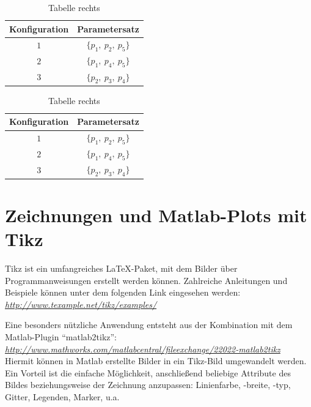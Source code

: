\begin{table}[htbp]
\caption{Hauptbeschriftung}
\centering
	\begin{subtable}[t]{.5\textwidth}
	\centering
			\caption{Tabelle links}
			\begin{tabular}{cc}
				\toprule
				Konfiguration & Parametersatz \\
				\midrule
				$1$ & $\{p_{1}, \: p_{2}, \: p_{5}\}$ \\
				$2$ & $\{p_{1}, \: p_{4}, \: p_{5}\}$ \\
				$3$ & $\{p_{2}, \: p_{3}, \: p_{4}\}$ \\
				\bottomrule
			\end{tabular}
			\label{tab:parameter_tabelle1}
	\end{subtable}%
	\begin{subtable}[t]{.5\textwidth}
			\centering
			\caption{Tabelle rechts}
			\begin{tabular}{cc}
				\toprule
				Konfiguration & Parametersatz \\
				\midrule
				$1$ & $\{p_{1}, \: p_{2}, \: p_{5}\}$ \\
				$2$ & $\{p_{1}, \: p_{4}, \: p_{5}\}$ \\
				$3$ & $\{p_{2}, \: p_{3}, \: p_{4}\}$ \\
				\bottomrule
			\end{tabular}
			\label{tab:parameter_tabelle2}
	\end{subtable}
	\label{tab:parameter_tabellen}
\end{table}




%
%
%
\clearpage
\section{Zeichnungen und Matlab-Plots mit Tikz}
\label{sec:tikz}

Tikz ist ein umfangreiches \LaTeX-Paket, mit dem Bilder über Programmanweisungen erstellt werden können.
Zahlreiche Anleitungen und Beispiele können unter dem folgenden Link eingesehen werden:\\ 
\href{http://www.texample.net/tikz/examples/}{\emph{http://www.texample.net/tikz/examples/}}

Eine besonders nützliche Anwendung entsteht aus der Kombination mit dem Matlab-Plugin "`matlab2tikz"':\\
\href{http://www.mathworks.com/matlabcentral/fileexchange/22022-matlab2tikz}{\emph{http://www.mathworks.com/matlabcentral/fileexchange/22022-matlab2tikz}}\\
Hiermit können in Matlab erstellte Bilder in ein Tikz-Bild umgewandelt werden.
Ein Vorteil ist die einfache Möglichkeit, anschließend beliebige Attribute des Bildes beziehungsweise der Zeichnung anzupassen: Linienfarbe, -breite, -typ, Gitter, Legenden, Marker, u.a.

